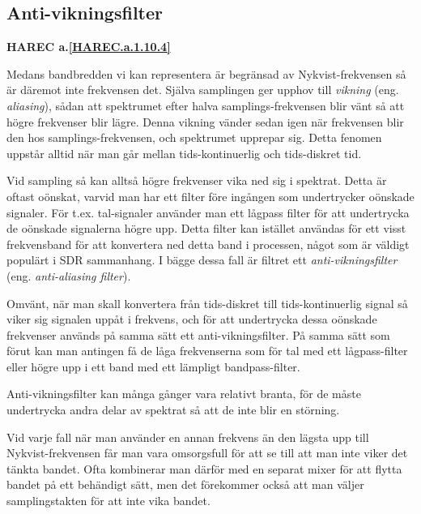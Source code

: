 \subsection{Anti-vikningsfilter}
\textbf{HAREC a.\ref{HAREC.a.1.10.4}\label{myHAREC.a.1.10.4}}

\begin{rev-nytt}[MAD]

Medans bandbredden vi kan representera är begränsad av Nykvist-frekvensen så
är däremot inte frekvensen det. Själva samplingen ger upphov till
\emph{vikning} (eng. \emph{aliasing}),
sådan att spektrumet efter halva samplings-frekvensen blir vänt så att högre
frekvenser blir lägre. Denna vikning vänder sedan igen när frekvensen blir
den hos samplings-frekvensen, och spektrumet upprepar sig. Detta fenomen
uppstår alltid när man går mellan tids-kontinuerlig och tids-diskret tid.


Vid sampling så kan alltså högre frekvenser vika ned sig i spektrat. Detta är
oftast oönskat, varvid man har ett filter före ingången som undertrycker
oönskade signaler. För t.ex. tal-signaler använder man ett lågpass filter för
att undertrycka de oönskade signalerna högre upp. Detta filter kan istället
användas för ett visst frekvensband för att konvertera ned detta band i
processen, något som är väldigt populärt i SDR sammanhang. I bägge dessa fall
är filtret ett \emph{anti-vikningsfilter} (eng. \emph{anti-aliasing filter}).

Omvänt, när man skall konvertera från tids-diskret till tids-kontinuerlig
signal så viker sig signalen uppåt i frekvens, och för att undertrycka dessa
oönskade frekvenser används på samma sätt ett anti-vikningsfilter. På samma
sätt som förut kan man antingen få de låga frekvenserna som för tal med ett
lågpass-filter eller högre upp i ett band med ett lämpligt bandpass-filter.

Anti-vikningsfilter kan många gånger vara relativt branta, för de måste
undertrycka andra delar av spektrat så att de inte blir en störning.

Vid varje fall när man använder en annan frekvens än den lägsta upp till
Nykvist-frekvensen får man vara omsorgsfull för att se till att man inte viker
det tänkta bandet. Ofta kombinerar man därför med en separat mixer för att
flytta bandet på ett behändigt sätt, men det förekommer också att man väljer
samplingstakten för att inte vika bandet.

\end{rev-nytt}

